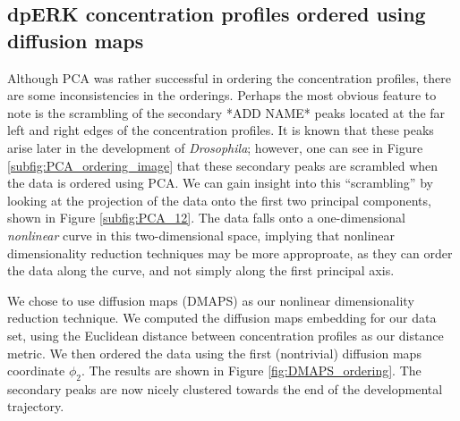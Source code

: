 \documentclass[10pt]{article}
\begin{document}
\subsection*{dpERK concentration profiles ordered using diffusion maps}

Although PCA was rather successful in ordering the concentration profiles, there are some inconsistencies in the orderings.
%
Perhaps the most obvious feature to note is the scrambling of the secondary *ADD NAME* peaks located at the far left and right edges of the concentration profiles.
%
It is known that these peaks arise later in the development of {\em Drosophila};
however, one can see in Figure \ref{subfig:PCA_ordering_image} that these secondary peaks are scrambled when the data is ordered using PCA.
%
We can gain insight into this ``scrambling'' by looking at the projection of the data onto the first two principal components, shown in Figure \ref{subfig:PCA_12}.
%
The data falls onto a one-dimensional {\em nonlinear} curve in this two-dimensional space, implying that nonlinear dimensionality reduction techniques may be more approproate, as they can order the data along the curve, and not simply along the first principal axis.

We chose to use diffusion maps (DMAPS) as our nonlinear dimensionality reduction technique.
%
We computed the diffusion maps embedding for our data set, using the Euclidean distance between concentration profiles as our distance metric.
%
We then ordered the data using the first (nontrivial) diffusion maps coordinate $\phi_2$. 
%
The results are shown in Figure \ref{fig:DMAPS_ordering}.
%
The secondary peaks are now nicely clustered towards the end of the developmental trajectory.
\end{document}
